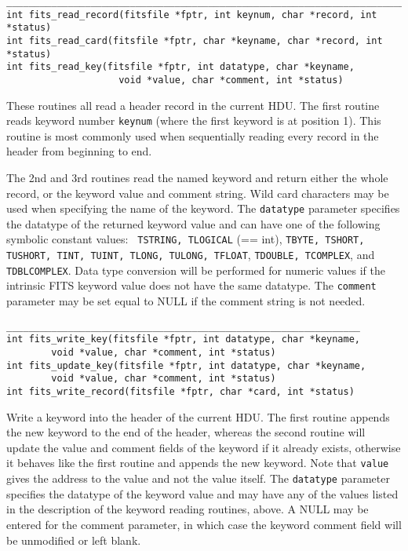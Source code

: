 \documentclass[11pt]{article}
\begin{document}
\begin{verbatim}
___________________________________________________________________________
int fits_read_record(fitsfile *fptr, int keynum, char *record, int *status)
int fits_read_card(fitsfile *fptr, char *keyname, char *record, int *status)
int fits_read_key(fitsfile *fptr, int datatype, char *keyname,
                    void *value, char *comment, int *status)
\end{verbatim}

These routines all read a header record in the current HDU. The
first routine reads keyword number {\tt keynum} (where the first
keyword is at position 1).  This routine is most commonly used when
sequentially reading every record in the header from beginning to end.

The 2nd and 3rd routines read the named keyword and return either the
whole record, or the keyword value and comment string.   Wild card
characters may be used when specifying the name of the keyword. The
{\tt datatype} parameter specifies the datatype of the returned keyword
value and can have one of the following symbolic constant values:  {\tt
TSTRING, TLOGICAL} (== int), {\tt TBYTE, TSHORT, TUSHORT, TINT, TUINT,
TLONG, TULONG, TFLOAT}, {\tt TDOUBLE, TCOMPLEX}, and {\tt
TDBLCOMPLEX}.  Data type conversion will be performed for numeric
values if the intrinsic FITS keyword value does not have the same
datatype.  The {\tt comment} parameter may be set equal to NULL if the
comment string is not needed.

\begin{verbatim}
_______________________________________________________________
int fits_write_key(fitsfile *fptr, int datatype, char *keyname, 
        void *value, char *comment, int *status)
int fits_update_key(fitsfile *fptr, int datatype, char *keyname,
        void *value, char *comment, int *status)
int fits_write_record(fitsfile *fptr, char *card, int *status)
\end{verbatim}

Write a keyword  into the header of the current HDU.  The first routine
appends the new keyword to the end of the header, whereas the second
routine will update the value and comment fields of the keyword if it
already exists, otherwise it behaves like the first routine and appends
the new keyword.  Note that {\tt value} gives the address to the value
and not the value itself.  The {\tt datatype} parameter specifies the
datatype of the keyword value and may have any of the values listed in
the description of the keyword reading routines, above.  A NULL may be
entered for the comment parameter, in which case the  keyword comment
field will be unmodified or left blank.
\end{document}
